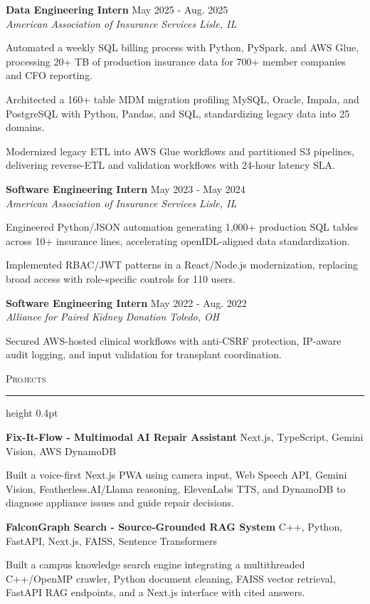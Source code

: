 \documentclass[letterpaper,11pt]{article}
\newcommand{\resumesection}[1]{%
  \par\vspace{2pt}%
  {\large\scshape #1}\par\vspace{2pt}%
  \hrule height 0.4pt\vspace{2pt}%
}
\newcommand{\resumeSubheading}[4]{
  \textbf{#1} \hfill #2\\
  \textit{#3} \hfill \textit{#4}
}
\newcommand{\projectHeading}[2]{
  \textbf{#1} \hfill #2
}
\begin{document}
\resumeSubheading
{Data Engineering Intern}{May 2025 - Aug. 2025}
{American Association of Insurance Services}{Lisle, IL}
\begin{tightitemize}
  \item Automated a weekly SQL billing process with Python, PySpark, and AWS Glue, processing 20+ TB of production insurance data for 700+ member companies and CFO reporting.
  \item Architected a 160+ table MDM migration profiling MySQL, Oracle, Impala, and PostgreSQL with Python, Pandas, and SQL, standardizing legacy data into 25 domains.
  \item Modernized legacy ETL into AWS Glue workflows and partitioned S3 pipelines, delivering reverse-ETL and validation workflows with 24-hour latency SLA.
\end{tightitemize}

\resumeSubheading
{Software Engineering Intern}{May 2023 - May 2024}
{American Association of Insurance Services}{Lisle, IL}
\begin{tightitemize}
  \item Engineered Python/JSON automation generating 1,000+ production SQL tables across 10+ insurance lines, accelerating openIDL-aligned data standardization.
  \item Implemented RBAC/JWT patterns in a React/Node.js modernization, replacing broad access with role-specific controls for 110 users.
\end{tightitemize}

\resumeSubheading
{Software Engineering Intern}{May 2022 - Aug. 2022}
{Alliance for Paired Kidney Donation}{Toledo, OH}
\begin{tightitemize}
  \item Secured AWS-hosted clinical workflows with anti-CSRF protection, IP-aware audit logging, and input validation for transplant coordination.
\end{tightitemize}

\resumesection{Projects}
\projectHeading{Fix-It-Flow - Multimodal AI Repair Assistant}{Next.js, TypeScript, Gemini Vision, AWS DynamoDB}
\begin{tightitemize}
  \item Built a voice-first Next.js PWA using camera input, Web Speech API, Gemini Vision, Featherless.AI/Llama reasoning, ElevenLabs TTS, and DynamoDB to diagnose appliance issues and guide repair decisions.
\end{tightitemize}

\vspace{-4pt}
\projectHeading{FalconGraph Search - Source-Grounded RAG System}{C++, Python, FastAPI, Next.js, FAISS, Sentence Transformers}
\begin{tightitemize}
  \item Built a campus knowledge search engine integrating a multithreaded C++/OpenMP crawler, Python document cleaning, FAISS vector retrieval, FastAPI RAG endpoints, and a Next.js interface with cited answers.
\end{tightitemize}
\end{document}
